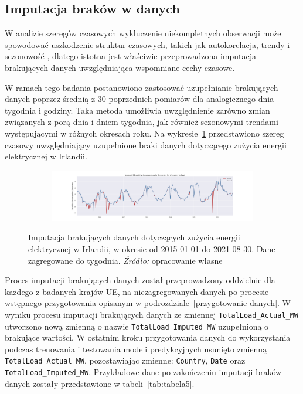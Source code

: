 \documentclass[polish, twoside, 12pt, a4paper]{article}
\theoremstyle{definition}
\theoremstyle{plain}
\theoremstyle{remark}
\newcommand{\code}[1]{\lstinline{#1}}
\begin{document}
\subsection{Imputacja braków w danych}

W analizie szeregów czasowych wykluczenie niekompletnych obserwacji może spowodować uszkodzenie struktur czasowych, takich jak autokorelacja, trendy i sezonowość \citep{box1994}, dlatego istotna jest właściwie przeprowadzona imputacja brakujących danych uwzględniająca wspomniane cechy czasowe. 

W ramach tego badania postanowiono zastosować uzupełnianie brakujących danych poprzez średnią z 30 poprzednich pomiarów dla analogicznego dnia tygodnia i godziny. Taka metoda umożliwia uwzględnienie zarówno zmian związanych z porą dnia i dniem tygodnia, jak również sezonowymi trendami występującymi w różnych okresach roku. Na wykresie~\ref{fig:x12} przedstawiono szereg czasowy uwzględniający uzupełnione braki danych dotyczącego zużycia energii elektrycznej w Irlandii.

\begin{figure}[hbt]
  \centering

  \begin{subfigure}[t]{0.95\textwidth}
    \includegraphics[width=\textwidth]{./out_figures/imputed_electricity_consumption_Ireland.png}
  \end{subfigure}

  \captionsetup{margin=10pt,font=small,labelfont=bf,width=.8\textwidth}

  \caption[Imputacja brakujących danych dotyczących zużycia energii elektrycznej w Irlandii, w okresie od 2015-01-01 do 2021-08-30. Dane zagregowane do tygodnia.]{Imputacja brakujących danych dotyczących zużycia energii elektrycznej w Irlandii, w okresie od 2015-01-01 do 2021-08-30. Dane zagregowane do tygodnia. \textit{Źródło:} opracowanie własne}\label{fig:x12}
\end{figure}

Proces imputacji brakujących danych został przeprowadzony oddzielnie dla każdego z badanych krajów UE, na niezagregowanych danych po procesie wstępnego przygotowania opisanym w podrozdziale~\ref{przygotowanie-danych}. W wyniku procesu imputacji brakujących danych ze zmiennej \code{TotalLoad_Actual_MW} utworzono nową zmienną o nazwie \code{TotalLoad_Imputed_MW} uzupełnioną o brakujące wartości. W ostatnim kroku przygotowania danych do wykorzystania podczas trenowania i testowania modeli predykcyjnych usunięto zmienną \code{TotalLoad_Actual_MW}, pozostawiając zmienne: \code{Country}, \code{Date} oraz \code{TotalLoad_Imputed_MW}. Przykładowe dane po zakończeniu imputacji braków danych zostały przedstawione w tabeli~\ref{tab:tabela5}.
\end{document}
